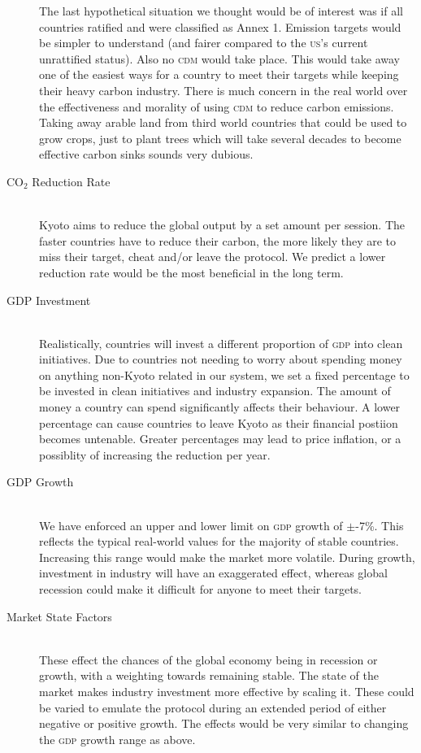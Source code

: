 \begin{description}
The last hypothetical situation we thought would be of interest was if all countries ratified and were classified as Annex 1. Emission targets would be simpler to understand (and fairer compared to the \textsc{us}'s current unrattified status). Also no \textsc{cdm} would take place. This would take away one of the easiest ways for a country to meet their targets while keeping their heavy carbon industry. There is much concern in the real world over the effectiveness and morality of using \textsc{cdm} to reduce carbon emissions. Taking away arable land from third world countries that could be used to grow crops, just to plant trees which will take several decades to become effective carbon sinks sounds very dubious.

\item[CO$_2$ Reduction Rate] \hfill \\

Kyoto aims to reduce the global \CO output by a set amount per session. The faster countries have to reduce their carbon, the more likely they are to miss their target, cheat and/or leave the protocol. We predict a lower reduction rate would be the most beneficial in the long term.

\item[GDP Investment] \hfill \\

Realistically, countries will invest a different proportion of \textsc{gdp} into clean initiatives. Due to countries not needing to worry about spending money on anything non-Kyoto related in our system, we set a fixed percentage to be invested in clean initiatives and industry expansion.   The amount of money a country can spend significantly affects their behaviour.  A lower percentage can cause countries to leave Kyoto as their financial postiion becomes untenable.  Greater percentages may lead to price inflation, or a possiblity of increasing the reduction per year.

\item[GDP Growth] \hfill \\

We have enforced an upper and lower limit on \textsc{gdp} growth of $\pm$-7\%. This reflects the typical real-world values for the majority of stable countries. Increasing this range would make the market more volatile. During growth, investment in industry will have an exaggerated effect, whereas global recession could make it difficult for anyone to meet their targets.

\item[Market State Factors] \hfill \\

These effect the chances of the global economy being in recession or growth, with a weighting towards remaining stable. The state of the market makes industry investment more effective by scaling it.  These could be varied to emulate the protocol during an extended period of either negative or positive growth. The effects would be very similar to changing the \textsc{gdp} growth range as above.
\end{description}

